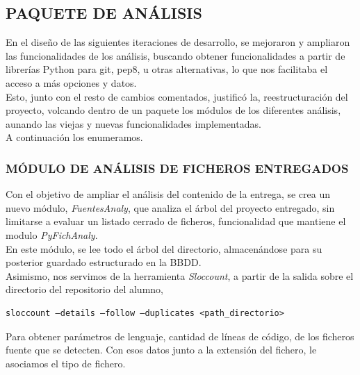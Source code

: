 \subsection{PAQUETE DE ANÁLISIS} 
\label{subsec:paq_anals}


En el diseño de las siguientes iteraciones de desarrollo, se mejoraron y ampliaron las funcionalidades de los análisis, buscando obtener funcionalidades a partir de librerías Python para git, pep8, u otras alternativas, lo que nos facilitaba el acceso a más opciones y datos.\\


Esto, junto con el resto de cambios comentados, justificó la, reestructuración del proyecto, volcando dentro de un paquete los módulos de los diferentes análisis, aunando las viejas y nuevas funcionalidades implementadas.\\

A continuación los enumeramos.


\subsubsection{MÓDULO DE ANÁLISIS DE FICHEROS ENTREGADOS} 
\label{subsec:mod_anal_fich}

Con el objetivo de ampliar el análisis del contenido de la entrega, se crea un nuevo módulo, \textit{FuentesAnaly}, que analiza el árbol del proyecto entregado, sin limitarse a evaluar un listado cerrado de ficheros, funcionalidad que mantiene el modulo \textit{PyFichAnaly}.\\


En este módulo, se lee todo el árbol del directorio, almacenándose para su posterior guardado estructurado en la BBDD.\\


Asimismo, nos servimos de la herramienta \textit{Sloccount}, a partir de la salida sobre el directorio del repositorio del alumno,

\begin{center}
\begin{verbatim}
sloccount –details –follow –duplicates <path_directorio>
\end{verbatim}
\end{center}

Para obtener parámetros de lenguaje, cantidad de líneas de código, de los ficheros fuente que se detecten. Con esos datos junto a la extensión del fichero, le asociamos el tipo de fichero.\\


